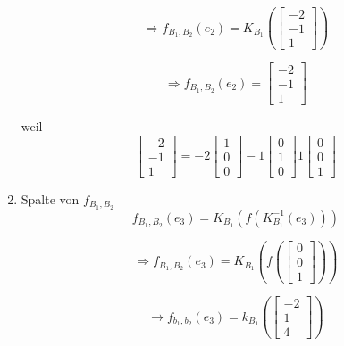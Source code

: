 \documentclass{report}
\begin{document}
\begin{enumerate}
        $$\Rightarrow f_{B_1,B_2}(e_2) = K_{B_1}(\begin{bmatrix}
            -2 \\
            -1 \\ 
            1
        \end{bmatrix}) $$

        $$\Rightarrow f_{B_1,B_2}(e_2) = \begin{bmatrix}
        -2 \\
            -1 \\ 
            1
        \end{bmatrix} $$

        weil 
        \[
           \begin{bmatrix}
            -2 \\
            -1 \\
            1 
           \end{bmatrix} = -2 
           \begin{bmatrix}
              1 \\
              0 \\
              0
           \end{bmatrix}   -1
           \begin{bmatrix}
              0 \\
              1 \\
              0
           \end{bmatrix}   1  
           \begin{bmatrix}
              0 \\
              0 \\
              1
           \end{bmatrix}    
        \] 

    \item Spalte von $f_{B_1,B_2}$
        $$f_{B_1,B_2}(e_3) = K_{B_1}(f(K_{B_1}^{-1}(e_3))) $$

        $$\Rightarrow f_{B_1,B_2}(e_3) = K_{B_1}(f(\begin{bmatrix}
            0 \\
            0 \\ 
            1
        \end{bmatrix})) $$

        $$\rightarrow f_{b_1,b_2}(e_3) = k_{B_1}(\begin{bmatrix}
           -2 \\
            1 \\ 
            4 
        \end{bmatrix}) $$


\end{enumerate}
\end{document}
